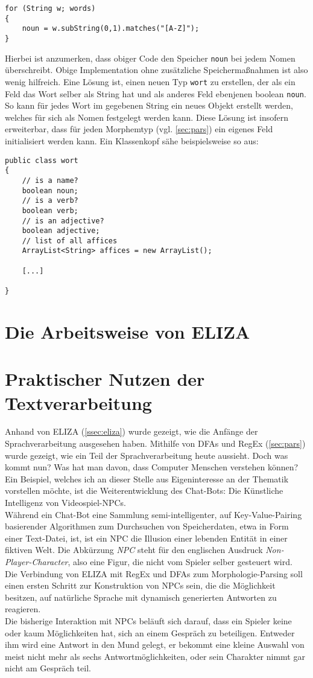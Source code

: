 \documentclass[12pt,twoside]{article}
\theoremstyle{plain}
\theoremstyle{definition}
\theoremstyle{remark}
\begin{document}
{\begin{lstlisting}
for (String w; words)
{
	noun = w.subString(0,1).matches("[A-Z]");
}
\end{lstlisting}
Hierbei ist anzumerken, dass obiger Code den Speicher \texttt{noun} bei jedem Nomen überschreibt.
Obige Implementation ohne zusätzliche Speichermaßnahmen ist also wenig hilfreich.
Eine Lösung ist, einen neuen Typ \texttt{wort} zu erstellen, der als ein Feld das Wort selber als String hat und als anderes Feld ebenjenen boolean \texttt{noun}.
So kann für jedes Wort im gegebenen String ein neues Objekt erstellt werden, welches für sich als Nomen festgelegt werden kann.
Diese Lösung ist insofern erweiterbar, dass für jeden Morphemtyp (vgl. \ref{sec:pars}) ein eigenes Feld initialisiert werden kann.
Ein Klassenkopf sähe beispielsweise so aus:
\begin{lstlisting}
public class wort
{
	// is a name?
	boolean noun;
	// is a verb?
	boolean verb;
	// is an adjective?
	boolean adjective;
	// list of all affices
	ArrayList<String> affices = new ArrayList();
	
	[...]

}
\end{lstlisting}
\section{Die Arbeitsweise von ELIZA}
\label{sec:eliza}
\section{Praktischer Nutzen der Textverarbeitung}
\label{sec:ausb}
Anhand von ELIZA (\ref{ssec:eliza}) wurde gezeigt, wie die Anfänge der Sprachverarbeitung ausgesehen haben.
Mithilfe von DFAs und RegEx (\ref{sec:pars}) wurde gezeigt, wie ein Teil der Sprachverarbeitung heute aussieht.
Doch was kommt nun?
Was hat man davon, dass Computer Menschen verstehen können?
Ein Beispiel, welches ich an dieser Stelle aus Eigeninteresse an der Thematik vorstellen möchte, ist die Weiterentwicklung des Chat-Bots: Die Künstliche Intelligenz von Videospiel-NPCs.\\
Während ein Chat-Bot eine Sammlung semi-intelligenter, auf Key-Value-Pairing basierender Algorithmen zum Durchsuchen von Speicherdaten, etwa in Form einer Text-Datei, ist, ist ein NPC die Illusion einer lebenden Entität in einer fiktiven Welt.
Die Abkürzung \textit{NPC} steht für den englischen Ausdruck \textit{Non-Player-Character}, also eine Figur, die nicht vom Spieler selber gesteuert wird.\\
Die Verbindung von ELIZA mit RegEx und DFAs zum Morphologie-Parsing soll einen ersten Schritt zur Konstruktion von NPCs sein, die die Möglichkeit besitzen, auf natürliche Sprache mit dynamisch generierten Antworten zu reagieren.\\
Die bisherige Interaktion mit NPCs beläuft sich darauf, dass ein Spieler keine oder kaum Möglichkeiten hat, sich an einem Gespräch zu beteiligen.
Entweder ihm wird eine Antwort in den Mund gelegt, er bekommt eine kleine Auswahl von meist nicht mehr als sechs Antwortmöglichkeiten, oder sein Charakter nimmt gar nicht am Gespräch teil.
}
\end{document}
